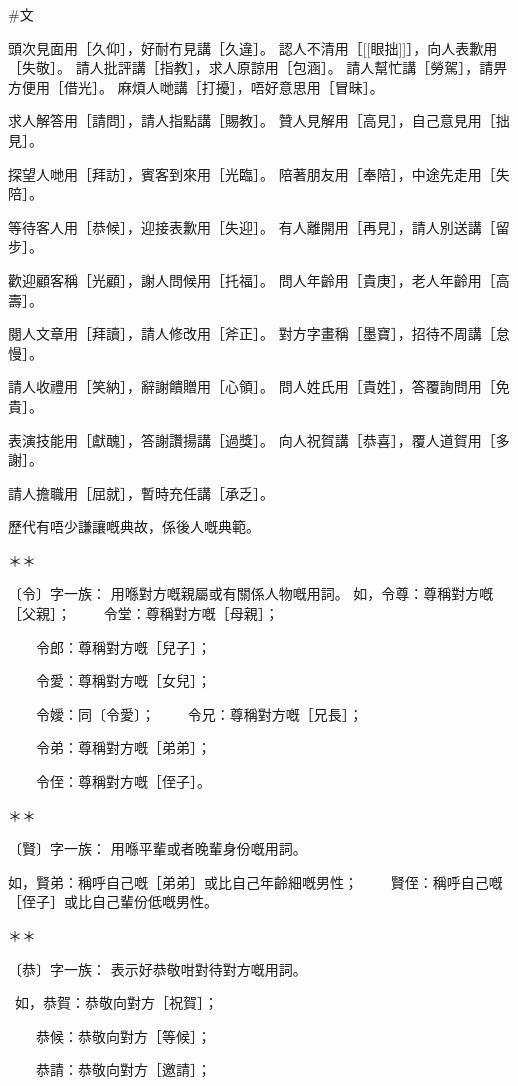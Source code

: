 #文 

頭次見面用［久仰］，好耐冇見講［久違］。
認人不清用［[[眼拙]]］，向人表歉用［失敬］。  
請人批評講［指教］，求人原諒用［包涵］。
請人幫忙講［勞駕］，請畀方便用［借光］。  
麻煩人哋講［打擾］，唔好意思用［冒昧］。

求人解答用［請問］，請人指點講［賜教］。  
贊人見解用［高見］，自己意見用［拙見］。

探望人哋用［拜訪］，賓客到來用［光臨］。  
陪著朋友用［奉陪］，中途先走用［失陪］。

等待客人用［恭候］，迎接表歉用［失迎］。  
有人離開用［再見］，請人別送講［留步］。

歡迎顧客稱［光顧］，謝人問候用［托福］。  
問人年齡用［貴庚］，老人年齡用［高壽］。

閱人文章用［拜讀］，請人修改用［斧正］。  
對方字畫稱［墨寶］，招待不周講［怠慢］。

請人收禮用［笑納］，辭謝饋贈用［心領］。  
問人姓氏用［貴姓］，答覆詢問用［免貴］。

表演技能用［獻醜］，答謝讚揚講［過獎］。  
向人祝賀講［恭喜］，覆人道賀用［多謝］。

請人擔職用［屈就］，暫時充任講［承乏］。  
  
歷代有唔少謙讓嘅典故，係後人嘅典範。  
  
＊＊

  

〔令〕字一族：  
用喺對方嘅親屬或有關係人物嘅用詞。  
如，令尊：尊稱對方嘅［父親］；  
　　令堂：尊稱對方嘅［母親］；

　　令郎：尊稱對方嘅［兒子］；

　　令愛：尊稱對方嘅［女兒］；

　　令嬡：同〔令愛〕；  
　　令兄：尊稱對方嘅［兄長］；

　　令弟：尊稱對方嘅［弟弟］；

　　令侄：尊稱對方嘅［侄子］。

  
＊＊  
  
〔賢〕字一族：  
用喺平輩或者晚輩身份嘅用詞。

如，賢弟：稱呼自己嘅［弟弟］或比自己年齡細嘅男性；  
　　賢侄：稱呼自己嘅［侄子］或比自己輩份低嘅男性。  
  
＊＊  
  
〔恭〕字一族：  
表示好恭敬咁對待對方嘅用詞。

 如，恭賀：恭敬向對方［祝賀］；

　　恭候：恭敬向對方［等候］；

　　恭請：恭敬向對方［邀請］；

